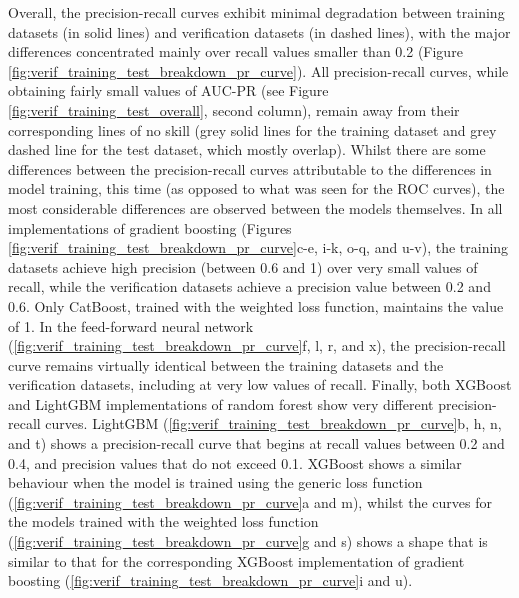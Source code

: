 \documentclass[nhess, manuscript]{copernicus}
\begin{document}
Overall, the precision-recall curves exhibit minimal degradation between \textcolor{colourTraining}{training datasets} (in solid lines) and verification datasets (in dashed lines), with the major differences concentrated mainly over recall values smaller than 0.2 (Figure \ref{fig:verif_training_test_breakdown_pr_curve}). All precision-recall curves, while obtaining fairly small values of AUC-PR (see Figure \ref{fig:verif_training_test_overall}, second column), remain away from their corresponding lines of no skill (grey solid lines for the training dataset and grey dashed line for the test dataset, which mostly overlap). Whilst there are some differences between the precision-recall curves attributable to the differences in model training, this time (as opposed to what was seen for the ROC curves), the most considerable differences are observed between the models themselves. In all implementations of gradient boosting (Figures \ref{fig:verif_training_test_breakdown_pr_curve}c-e, i-k, o-q, and u-v), the training datasets achieve high precision (between 0.6 and 1) over very small values of recall, while the verification datasets achieve a precision value between 0.2 and 0.6. Only CatBoost, trained with the weighted loss function, maintains the value of 1. In the feed-forward neural network (\ref{fig:verif_training_test_breakdown_pr_curve}f, l, r, and x), the precision-recall curve remains virtually identical between the training datasets and the verification datasets, including at very low values of recall. Finally, both XGBoost and LightGBM implementations of random forest show very different precision-recall curves. LightGBM (\ref{fig:verif_training_test_breakdown_pr_curve}b, h, n, and t) shows a precision-recall curve that begins at recall values between 0.2 and 0.4, and precision values that do not exceed 0.1. XGBoost shows a similar behaviour when the model is trained using the generic loss function (\ref{fig:verif_training_test_breakdown_pr_curve}a and m), whilst the curves for the models trained with the weighted loss function (\ref{fig:verif_training_test_breakdown_pr_curve}g and s) shows a shape that is similar to that for the corresponding XGBoost implementation of gradient boosting (\ref{fig:verif_training_test_breakdown_pr_curve}i and u).
\end{document}

